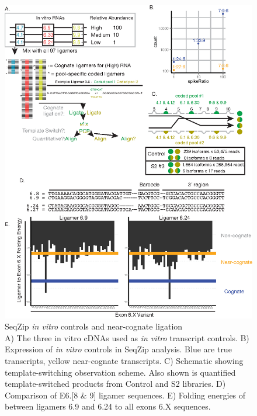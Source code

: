 		\begin{figure} %
			\centering 
			\includegraphics{Figures/SeqZipPaper/Roy2014FigS2.eps}
			\caption[SeqZip \textit{in vitro} \dscam{} controls and near-cognate ligation]
			{
				SeqZip \textit{in vitro} \dscam{} controls and near-cognate ligation\\[0.25cm]
				A) The three in vitro cDNAs used as \textit{in vitro} transcript controls. B) Expression of \textit{in vitro} controls in SeqZip analysis. Blue are true transcripts, yellow near-cognate transcripts. C) Schematic showing template-switching observation scheme. Also shown is quantified template-switched products from Control and S2 libraries. D) Comparison of E6.[8 \& 9] ligamer sequences. E) Folding energies of between ligamers 6.9 and 6.24 to all exons 6.X sequences.
				}
			\label{SeqZipPaper:fig:Roy2014 S2}
			\end{figure}

